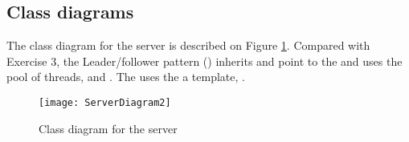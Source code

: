 \documentclass[Main]{subfiles}
\begin{document}
\subsection{Class diagrams}
The class diagram for the server is described on Figure \ref{fig:serverClass}. 
Compared with Exercise 3, the Leader/follower pattern () inherits and point to the  and uses the pool of threads, and .
The  uses the a template, .

\begin{figure}[hbtp]
\centering
\texttt{[image: ServerDiagram2]}
\caption{Class diagram for the server}
\label{fig:serverClass}
\end{figure}
\end{document}
